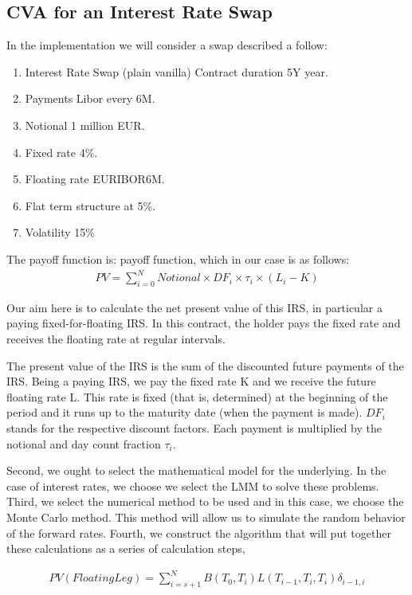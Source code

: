 \documentclass[11pt]{article}
\numberwithin{equation}{subsection}
\begin{document}
\subsection{CVA for an Interest Rate Swap}
In the implementation we will consider a swap described a follow: 
\begin{enumerate}
	\item Interest Rate Swap (plain vanilla) Contract duration 5Y year. 
	\item Payments Libor every 6M. 
	\item Notional 1 million EUR. 
	\item Fixed rate 4\%. 
	\item Floating rate EURIBOR6M. 
	\item Flat term structure at 5\%. 
	\item Volatility 15\%	
\end{enumerate}
The payoff function is: 
payoff function, which in our case is as follows:
\begin{eqnarray*}
	PV = \sum_{i=0}^{N} Notional \times DF_{i} \times \tau_{i} \times (L_{i}-K)
\end{eqnarray*}

Our aim here is to calculate the net present value of this IRS, in particular a paying
fixed-for-floating IRS. In this contract, the holder pays the fixed rate and receives the
floating rate at regular intervals.

The present value of the IRS is the sum of the discounted future payments of the IRS.
Being a paying IRS, we pay the fixed rate K and we receive the future floating rate L.
This rate is fixed (that is, determined) at the beginning of the period and it runs up to
the maturity date (when the payment is made). \(DF_{i}\) stands for the respective discount
factors. Each payment is multiplied by the notional and day count fraction \(\tau_{i}\).

Second, we ought to select the mathematical model for the underlying. In the case
of interest rates, we choose we select the LMM to solve these problems. 
Third, we select the numerical method to be used and in this case, we choose the Monte Carlo method. This method will allow
us to simulate the random behavior of the forward rates. Fourth, we construct the
algorithm that will put together these calculations as a series of calculation steps,


\begin{eqnarray*}
	PV(Floating Leg) = \sum_{i=s+1}^{N} B(T_0, T_{i}) L(T_{i-1}, T_{i}, T_{i}) \delta_{i−1,i} 
\end{eqnarray*}
\end{document}
